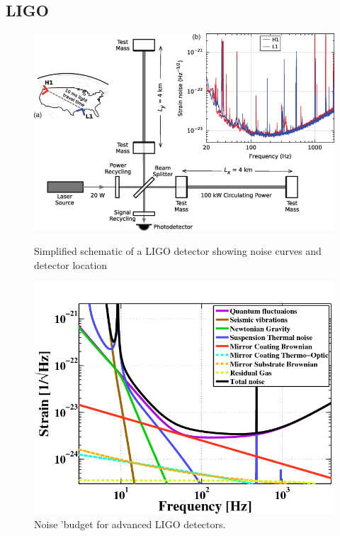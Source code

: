 \documentclass[11pt]{article}
\begin{document}
\subsection{LIGO}
\begin{figure}
	\includegraphics[scale=0.45]{fig4.png}
	\centering
	\caption{Simplified schematic of a LIGO detector\cite{advfig} showing noise curves and detector location}
	\centering
	\includegraphics[scale=0.40]{fig5.png}
	\centering
	\caption{\cite{noisecurve}Noise 'budget for advanced LIGO detectors.}
	\centering
\end{figure}
\end{document}
